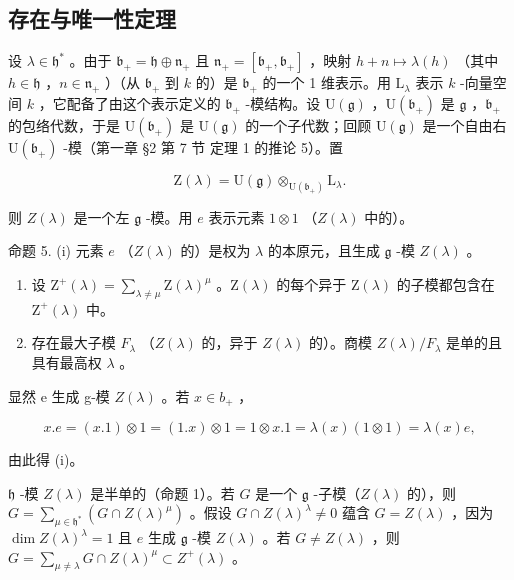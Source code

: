 \subsection{存在与唯一性定理}

设 \(\lambda \in \mathfrak{h}^*\) 。由于 \(\mathfrak{b}_{+} = \mathfrak{h} \oplus \mathfrak{n}_{+}\) 且 \(\mathfrak{n}_{+} = [\mathfrak{b}_{+}, \mathfrak{b}_{+}]\) ，映射 \(h + n \mapsto \lambda(h)\) （其中 \(h \in \mathfrak{h}\) ，\(n \in \mathfrak{n}_{+}\) ）（从 \(\mathfrak{b}_{+}\) 到 \(k\) 的）是 \(\mathfrak{b}_{+}\) 的一个 1 维表示。用 \(\mathrm{L}_{\lambda}\) 表示 \(k\) -向量空间 \(k\) ，它配备了由这个表示定义的 \(\mathfrak{b}_{+}\) -模结构。设 \(\mathrm{U}(\mathfrak{g})\) ，\(\mathrm{U}(\mathfrak{b}_{+})\) 是 \(\mathfrak{g}\) ，\(\mathfrak{b}_{+}\) 的包络代数，于是 \(\mathrm{U}(\mathfrak{b}_{+})\) 是 \(\mathrm{U}(\mathfrak{g})\) 的一个子代数；回顾 \(\mathrm{U}(\mathfrak{g})\) 是一个自由右 \(\mathrm{U}(\mathfrak{b}_{+})\) -模（第一章 §2 第 7 节 定理 1 的推论 5）。置

\[
\mathrm{Z} (\lambda) = \mathrm{U} (\mathfrak {g}) \otimes_ {\mathrm{U} (\mathfrak {b} _ {+})} \mathrm{L} _ {\lambda}.\tag{2}
\]

则 \(Z(\lambda)\) 是一个左 \(\mathfrak{g}\) -模。用 \(e\) 表示元素 \(1 \otimes 1\) （\(Z(\lambda)\) 中的）。

命题 5. (i) 元素 \(e\) （\(Z(\lambda)\) 的）是权为 \(\lambda\) 的本原元，且生成 \(\mathfrak{g}\) -模 \(Z(\lambda)\) 。

\begin{enumerate}
\def\labelenumi{(\roman{enumi})}
\setcounter{enumi}{1}
\item
  设 \(\mathrm{Z}^{+}(\lambda) = \sum_{\lambda \neq \mu} \mathrm{Z}(\lambda)^{\mu}\) 。\(\mathrm{Z}(\lambda)\) 的每个异于 \(\mathrm{Z}(\lambda)\) 的子模都包含在 \(\mathrm{Z}^{+}(\lambda)\) 中。
\item
  存在最大子模 \(F_{\lambda}\) （\(Z(\lambda)\) 的，异于 \(Z(\lambda)\) 的）。商模 \(Z(\lambda)/F_{\lambda}\) 是单的且具有最高权 \(\lambda\) 。
\end{enumerate}

显然 e 生成 g-模 \(Z(\lambda)\) 。若 \(x \in b_{+}\) ，

\[
x. e = (x. 1) \otimes 1 = (1. x) \otimes 1 = 1 \otimes x. 1 = \lambda (x) (1 \otimes 1) = \lambda (x) e,
\]

由此得 (i)。

\(\mathfrak{h}\) -模 \(Z(\lambda)\) 是半单的（命题 1）。若 \(G\) 是一个 \(\mathfrak{g}\) -子模（\(Z(\lambda)\) 的），则 \(G = \sum_{\mu \in \mathfrak{h}^*}(G \cap Z(\lambda)^\mu)\) 。假设 \(G \cap Z(\lambda)^\lambda \neq 0\) 蕴含 \(G = Z(\lambda)\) ，因为 \(\dim Z(\lambda)^\lambda = 1\) 且 \(e\) 生成 \(\mathfrak{g}\) -模 \(Z(\lambda)\) 。若 \(G \neq Z(\lambda)\) ，则 \(G = \sum_{\mu \neq \lambda} G \cap Z(\lambda)^\mu \subset Z^+( \lambda)\) 。

